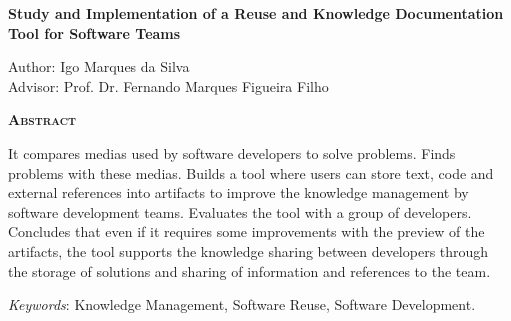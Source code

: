 \begin{center}
	{\Large{\textbf{Study and Implementation of a Reuse and Knowledge Documentation Tool for Software Teams}}}
\end{center}

\vspace{1cm}

\begin{flushright}
	Author: Igo Marques da Silva\\
	Advisor: Prof. Dr. Fernando Marques Figueira Filho
\end{flushright}

\vspace{1cm}

\begin{center}
	\Large{\textsc{\textbf{Abstract}}}
\end{center}

\noindent It compares medias used by software developers to solve problems. Finds problems with these medias. Builds a tool where users can store text, code and external references into artifacts to improve the knowledge management by software development teams. Evaluates the tool with a group of developers. Concludes that even if it requires some improvements with the preview of the artifacts, the tool supports the knowledge sharing between developers through the storage of solutions and sharing of information and references to the team.

\noindent\textit{Keywords}: Knowledge Management, Software Reuse, Software Development.
